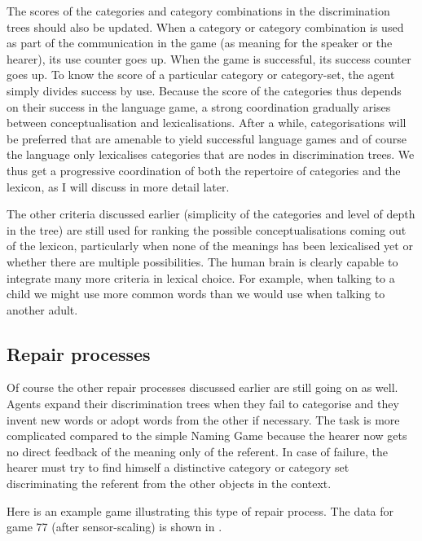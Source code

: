The scores of the categories and category
combinations in the discrimination trees should also 
be updated. When a category or category combination
is used as part of the communication 
in the game (as meaning for the speaker or
the hearer), its use counter goes up. When 
the game is successful, its success counter 
goes up. To know the score of a particular 
category or category-set, the agent simply 
divides success by use. Because the score of the categories 
thus depends on their success in the 
language game, a strong coordination gradually 
arises between conceptualisation and 
lexicalisations. After a while, categorisations
will be preferred that are amenable to yield
successful language games and of course the 
language only lexicalises categories that are 
nodes in discrimination trees. 
We thus get a progressive coordination of 
both the repertoire of categories and the 
lexicon, as I will discuss in more detail later. 

The other criteria discussed earlier (simplicity of 
the categories and level of depth in the tree) are 
still used for ranking the possible conceptualisations
coming out of the lexicon, particularly when none
of the meanings has been lexicalised yet or whether
there are multiple possibilities. The human brain 
is clearly capable to integrate many more criteria
in lexical choice. For example, when talking to a 
child we might use more common words than we would use 
when talking to another adult. 

\subsection{Repair processes}

Of course the other repair processes discussed earlier 
are still going on as well. Agents expand their 
discrimination trees when they fail to categorise and 
they invent new words or adopt words from the 
other if necessary. The task is more complicated compared
to the simple Naming Game because the hearer now gets
no direct feedback of the meaning only of the referent. 
In case of failure, the hearer must try to find himself a distinctive
category or category set discriminating the 
referent from the other objects in the context.

Here is an example game illustrating this
type of repair process. 
The data for game 77 (after sensor-scaling)
is shown in . 


